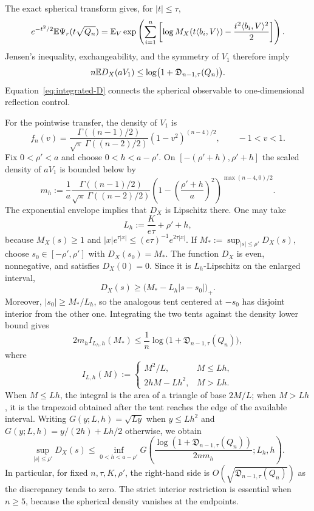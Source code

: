 The exact spherical transform gives, for $|t|\le\tau$,
\begin{equation}\label{eq:spherical-discrepancy-identity}
e^{-t^2/2}\mathbb E\Psi_r(t\sqrt{Q_n})
=\mathbb E_V\exp\left(\sum_{i=1}^n\left[\log M_X(t\langle b_i,V\rangle)-\frac{t^2\langle b_i,V\rangle^2}{2}\right]\right).
\end{equation}
Jensen's inequality, exchangeability, and the symmetry of $V_1$ therefore imply
\begin{equation}\label{eq:integrated-D}
n\mathbb E D_X(aV_1)\le\log\bigl(1+\mathfrak D_{n-1,\tau}(Q_n)\bigr).
\end{equation}
Equation~\eqref{eq:integrated-D} connects the spherical observable to one-dimensional reflection control.

For the pointwise transfer, the density of $V_1$ is
\[
f_n(v)=
\frac{\Gamma((n-1)/2)}{\sqrt\pi\,\Gamma((n-2)/2)}
(1-v^2)^{(n-4)/2},
\qquad -1<v<1.
\]
Fix $0<\rho'<a$ and choose $0<h<a-\rho'$. On $[-(\rho'+h),\rho'+h]$ the scaled density of $aV_1$ is bounded below by
\[
m_h:=\frac1a\frac{\Gamma((n-1)/2)}{\sqrt\pi\,\Gamma((n-2)/2)}
\left(1-\left(\frac{\rho'+h}{a}\right)^2\right)^{\max(n-4,0)/2}.
\]
The exponential envelope implies that $D_X$ is Lipschitz there. One may take
\[
L_h:=\frac{K}{e\tau}+\rho'+h,
\]
because $M_X(s)\ge1$ and $|x|e^{\tau|x|}\le(e\tau)^{-1}e^{2\tau|x|}$. If $M_*:=\sup_{|s|\le\rho'}D_X(s)$, choose $s_0\in[-\rho',\rho']$ with $D_X(s_0)=M_*$. The function $D_X$ is even, nonnegative, and satisfies $D_X(0)=0$. Since it is $L_h$-Lipschitz on the enlarged interval,
\[
D_X(s)\ge\bigl(M_*-L_h|s-s_0|\bigr)_+.
\]
Moreover, $|s_0|\ge M_*/L_h$, so the analogous tent centered at $-s_0$ has disjoint interior from the other one. Integrating the two tents against the density lower bound gives
\[
2m_h I_{L_h,h}(M_*)
 \le \frac1n\log\bigl(1+\mathfrak D_{n-1,\tau}(Q_n)\bigr),
\]
where
\[
I_{L,h}(M):=
\begin{cases}
M^2/L,& M\le Lh,\\
2hM-Lh^2,& M>Lh.
\end{cases}
\]
When $M\le Lh$, the integral is the area of a triangle of base $2M/L$; when $M>Lh$, it is the trapezoid obtained after the tent reaches the edge of the available interval. Writing $G(y;L,h)=\sqrt{Ly}$ when $y\le Lh^2$ and $G(y;L,h)=y/(2h)+Lh/2$ otherwise, we obtain
\begin{equation}\label{eq:pointwise-D}
\sup_{|s|\le\rho'}D_X(s)
\le\inf_{0<h<a-\rho'}G\left(\frac{\log(1+\mathfrak D_{n-1,\tau}(Q_n))}{2nm_h};L_h,h\right).
\end{equation}
In particular, for fixed $n,\tau,K,\rho'$, the right-hand side is $O(\sqrt{\mathfrak D_{n-1,\tau}(Q_n)})$ as the discrepancy tends to zero. The strict interior restriction is essential when $n\ge5$, because the spherical density vanishes at the endpoints.

